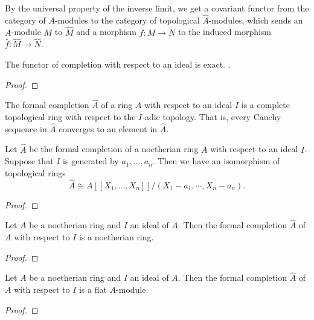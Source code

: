     By the universal property of the inverse limit, 
    we get a covariant functor from the category of \(A\)-modules to the category of topological \(\widehat{A}\)-modules, 
    which sends an \(A\)-module \(M\) to \(\widehat{M}\) and a morphism \(f: M \to N\) to the induced morphism \(\widehat{f}: \widehat{M} \to \widehat{N}\).

    \begin{lemma}\label{lem: completion is exact}
        The functor of completion with respect to an ideal is exact.
        .
    \end{lemma}
    \begin{proof}
    \end{proof}

    \begin{proposition}\label{prop: completion is complete}
        The formal completion \(\widehat{A}\) of a ring \(A\) with respect to an ideal \(I\) is a complete topological ring with respect to the \(I\)-adic topology.
        That is, every Cauchy sequence in \(\widehat{A}\) converges to an element in \(\widehat{A}\).
    \end{proposition}

    \begin{lemma}\label{lem: completion is isomorphic to image of power series}
        Let \(\widehat{A}\) be the formal completion of a noetherian ring \(A\) with respect to an ideal \(I\). 
        Suppose that \(I\) is generated by \(a_1,...,a_n\). 
        Then we have an isomorphism of topological rings
        \[ \widehat{A} \cong A[[X_1, \ldots, X_n]]/(X_1-a_1, \cdots, X_n-a_n). \]
    \end{lemma}
    \begin{proof}
    \end{proof}

    \begin{proposition}\label{prop: completion is noetherian}
        Let \(A\) be a noetherian ring and \(I\) an ideal of \(A\). 
        Then the formal completion \(\widehat{A}\) of \(A\) with respect to \(I\) is a noetherian ring.
    \end{proposition}
    \begin{proof}
    \end{proof}

    \begin{proposition}\label{prop: completion is flat}
        Let \(A\) be a noetherian ring and \(I\) an ideal of \(A\). 
        Then the formal completion \(\widehat{A}\) of \(A\) with respect to \(I\) is a flat \(A\)-module.
    \end{proposition}
    \begin{proof}
    \end{proof}

